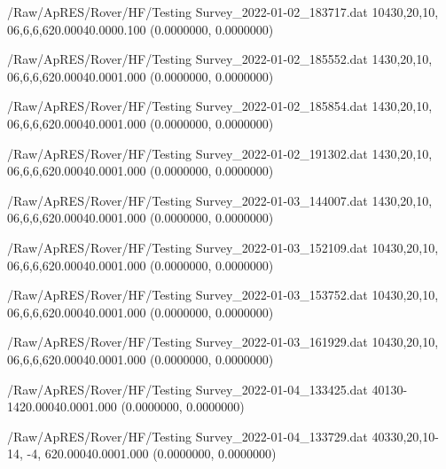 \hfaprestable
{/Raw/ApRES/Rover/HF/Testing}%
{Survey\_2022-01-02\_183717.dat}%
{10}{4}{30,20,10, 0}{6,6,6,6}{20.000}{40.000}{0.100}%
{ (0.0000000, 0.0000000)}%
{}%
{}%

\hfaprestable
{/Raw/ApRES/Rover/HF/Testing}%
{Survey\_2022-01-02\_185552.dat}%
{1}{4}{30,20,10, 0}{6,6,6,6}{20.000}{40.000}{1.000}%
{ (0.0000000, 0.0000000)}%
{}%
{}%

\hfaprestable
{/Raw/ApRES/Rover/HF/Testing}%
{Survey\_2022-01-02\_185854.dat}%
{1}{4}{30,20,10, 0}{6,6,6,6}{20.000}{40.000}{1.000}%
{ (0.0000000, 0.0000000)}%
{}%
{}%

\hfaprestable
{/Raw/ApRES/Rover/HF/Testing}%
{Survey\_2022-01-02\_191302.dat}%
{1}{4}{30,20,10, 0}{6,6,6,6}{20.000}{40.000}{1.000}%
{ (0.0000000, 0.0000000)}%
{}%
{}%

\hfaprestable
{/Raw/ApRES/Rover/HF/Testing}%
{Survey\_2022-01-03\_144007.dat}%
{1}{4}{30,20,10, 0}{6,6,6,6}{20.000}{40.000}{1.000}%
{ (0.0000000, 0.0000000)}%
{}%
{}%

\hfaprestable
{/Raw/ApRES/Rover/HF/Testing}%
{Survey\_2022-01-03\_152109.dat}%
{10}{4}{30,20,10, 0}{6,6,6,6}{20.000}{40.000}{1.000}%
{ (0.0000000, 0.0000000)}%
{}%
{}%

\hfaprestable
{/Raw/ApRES/Rover/HF/Testing}%
{Survey\_2022-01-03\_153752.dat}%
{10}{4}{30,20,10, 0}{6,6,6,6}{20.000}{40.000}{1.000}%
{ (0.0000000, 0.0000000)}%
{}%
{}%

\hfaprestable
{/Raw/ApRES/Rover/HF/Testing}%
{Survey\_2022-01-03\_161929.dat}%
{10}{4}{30,20,10, 0}{6,6,6,6}{20.000}{40.000}{1.000}%
{ (0.0000000, 0.0000000)}%
{}%
{}%

\hfaprestable
{/Raw/ApRES/Rover/HF/Testing}%
{Survey\_2022-01-04\_133425.dat}%
{40}{1}{30}{-14}{20.000}{40.000}{1.000}%
{ (0.0000000, 0.0000000)}%
{}%
{}%

\hfaprestable
{/Raw/ApRES/Rover/HF/Testing}%
{Survey\_2022-01-04\_133729.dat}%
{40}{3}{30,20,10}{-14, -4,  6}{20.000}{40.000}{1.000}%
{ (0.0000000, 0.0000000)}%
{}%
{}%

